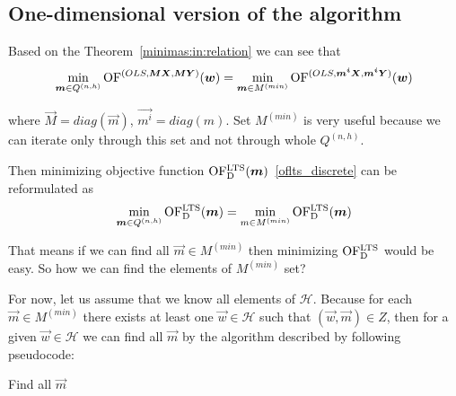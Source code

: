\subsection{ One-dimensional version of the algorithm}

Based on the Theorem~\ref{minimas:in:relation} we can see that
\begin{equation}
    \operatorname*{min}_{\boldsymbol{m} \in Q^{(n,h)}} \operatorname{OF}^{(OLS,\boldsymbol{M}\boldsymbol{X}, \boldsymbol{M}\boldsymbol{Y})} (\boldsymbol{w}) =
    \operatorname*{min}_{ \boldsymbol{m} \in M^{(min)}} \operatorname{OF}^{(OLS,\boldsymbol{m^i}\boldsymbol{X}, \boldsymbol{m^i}\boldsymbol{Y})} (\boldsymbol{w})
\end{equation}

where $\vec{M} = diag(\vec{m})$, $\vec{m^i} = diag(m)$. Set $M^{(min)}$ is very useful because we can iterate only through this set and not through whole $Q^{(n,h)}$.

Then minimizing objective function $\operatorname{OF^{LTS}_D}(\boldsymbol{m})$~\eqref{oflts_discrete} can be reformulated as 
\begin{equation} \label{mminqnh}
    \operatorname*{min}_{\boldsymbol{m} \in Q^{(n,h)}}  \operatorname{OF^{LTS}_D}(\boldsymbol{m}) = \operatorname*{min}_{m \in M^{(min)}} \operatorname{OF^{LTS}_D}(\boldsymbol{m})
\end{equation}


That means if we can find all $\vec{m} \in M^{(min)}$ then minimizing $\operatorname{OF^{LTS}_D}$ would be easy.
So how we can find the elements of $M^{(min)}$ set? 

For now, let us assume that we know all elements of $\mathcal{H}$. Because for each $\vec{m} \in M^{(min)}$ there exists at least one $\vec{w} \in \mathcal{H}$ such that $(\vec{w}, \vec{m}) \in Z$, then for a given $\vec{w} \in \mathcal{H}$ we can find all $\vec{m}$ by the algorithm described by following pseudocode:

\begin{algorithm}[H]
    \label{find:all:m}

      \caption{Find all $\vec{m}$}


      

    \;
\end{algorithm}

